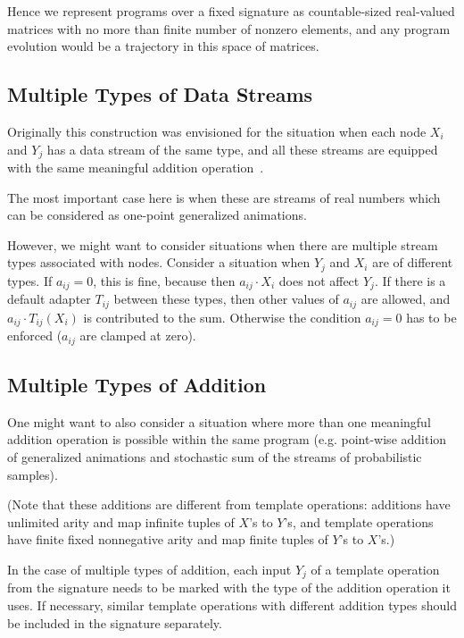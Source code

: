 \documentclass[withtimes]{easychair}
\begin{document}
Hence we represent programs over a fixed signature as countable-sized real-valued matrices with
no more than finite number of nonzero elements, and any program evolution would be
a trajectory in this space of matrices.

\subsection{Multiple Types of Data Streams}

Originally this construction was envisioned
for the situation when each node $X_i$ and $Y_j$ has a data stream of the same type,
and all these streams are equipped with the same meaningful addition operation~\cite{MBukatinMatthews}.

The most important case here is when these are streams of real numbers which can be considered as
one-point generalized animations.

However, we might want to consider situations when there are multiple stream types associated with nodes.
Consider a situation when $Y_j$ and $X_i$ are of different types. If $a_{ij} = 0$, this is fine, because then
$a_{ij} \cdot X_i$ does not affect $Y_j$. If there is a default adapter $T_{ij}$ between these types, then other values of $a_{ij}$
are allowed, and $a_{ij} \cdot T_{ij}(X_i)$ is contributed to the sum. Otherwise the condition
$a_{ij} = 0$ has to be enforced ($a_{ij}$ are clamped at zero).


\subsection{Multiple Types of Addition}

One might want to also consider a situation where more than one meaningful
addition operation is possible within the same program (e.g. point-wise addition of generalized animations
and stochastic sum of the streams of probabilistic samples).

(Note that these additions are different from template operations: additions have unlimited arity and map infinite
tuples of $X$'s to $Y$'s, and template operations have finite fixed nonnegative arity and map 
finite tuples of $Y$'s to $X$'s.)

In the case of multiple types of addition, each input $Y_j$ of a template operation from the signature needs to be marked with the type of
the addition operation it uses. If necessary, similar template operations with different addition types should
be included in the signature separately.
\end{document}
